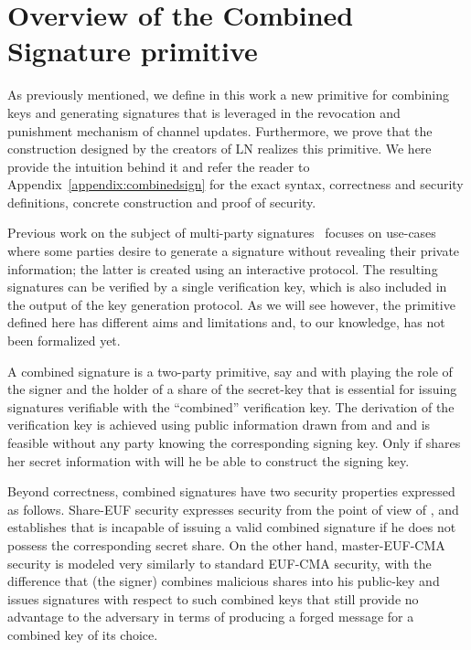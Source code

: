 \section{Overview of the Combined Signature primitive}
\label{sec:ov-combined-ds}
  As previously mentioned, we define in this work a new primitive for combining
  keys and generating signatures that is leveraged in the revocation and
  punishment mechanism of channel updates. Furthermore, we prove that the
  construction designed by the creators of LN realizes this primitive. We here
  provide the intuition behind it and refer the reader to
  Appendix~\ref{appendix:combinedsign} for the exact syntax, correctness and
  security definitions, concrete construction and proof of security.

  Previous work on the subject of multi-party
  signatures~\cite{DBLP:conf/ndss/NicolosiKDM03,DBLP:journals/iacr/BellareS01,boyd1986digital,DBLP:conf/ndss/Ganesan95a,DBLP:conf/crypto/MacKenzieR01,ganesan1994secure}
  focuses on use-cases where some parties desire to generate a signature without
  revealing their private information; the latter is created using an
  interactive protocol. The resulting signatures can be verified by a single
  verification key, which is also included in the output of the key generation
  protocol. As we will see however, the primitive defined here has different
  aims and limitations and, to our knowledge, has not been formalized yet.

  A combined signature is a two-party primitive, say \alice{} and \bob{} with
  \bob{} playing the role of the signer and \alice{} the holder of a share of
  the secret-key that is essential for issuing signatures verifiable with the
  ``combined'' verification key. The  derivation of the verification key is
  achieved  using public information drawn from  \alice{} and \bob{} and is
  feasible without any party knowing the corresponding signing key. Only if
  \alice{} shares her secret information with \bob{} will he be able to
  construct the signing key.

  Beyond correctness, combined signatures have two security properties expressed
  as follows. Share-EUF security expresses security from the point of view of
  \alice{}, and establishes that \bob{} is incapable of issuing a valid combined
  signature if he does not possess the corresponding secret share. On the other
  hand, master-EUF-CMA security is modeled very similarly to standard EUF-CMA
  security, with the difference that \bob{} (the signer) combines malicious
  shares into his public-key and issues signatures with respect to such combined
  keys that still provide no advantage to the adversary in terms of producing a
  forged message for a combined key of its choice.

